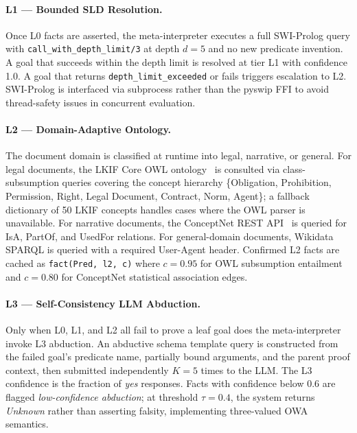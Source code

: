 \documentclass[11pt,letterpaper]{article}
\begin{document}
\paragraph{L1 --- Bounded SLD Resolution.}
Once L0 facts are asserted, the meta-interpreter executes a full SWI-Prolog query with \texttt{call\_with\_depth\_limit/3} at depth
$d = 5$ and no new predicate invention. A goal that succeeds within the depth limit is resolved at tier L1 with confidence
1.0. A goal that returns \texttt{depth\_limit\_exceeded} or fails triggers escalation to L2. SWI-Prolog is interfaced via subprocess
rather than the pyswip FFI to avoid thread-safety issues in concurrent evaluation.

\paragraph{L2 --- Domain-Adaptive Ontology.}
The document domain is classified at runtime into legal, narrative, or general. For legal documents, the LKIF Core OWL
ontology~\citep{Hoekstra2007} is consulted via class-subsumption queries covering the concept hierarchy \{Obligation, Prohibition, Permission,
Right, Legal Document, Contract, Norm, Agent\}; a fallback dictionary of 50 LKIF concepts handles cases where the OWL
parser is unavailable. For narrative documents, the ConceptNet REST API~\citep{Speer2017} is queried for IsA, PartOf, and UsedFor relations.
For general-domain documents, Wikidata SPARQL is queried with a required User-Agent header. Confirmed L2 facts are cached
as \texttt{fact(Pred, l2, c)} where $c = 0.95$ for OWL subsumption entailment and $c = 0.80$ for ConceptNet statistical association
edges.

\paragraph{L3 --- Self-Consistency LLM Abduction.}
Only when L0, L1, and L2 all fail to prove a leaf goal does the meta-interpreter
invoke L3 abduction. An abductive schema template query is constructed from the failed goal's predicate name, partially
bound arguments, and the parent proof context, then submitted independently $K = 5$ times to the LLM. The L3 confidence
is the fraction of \emph{yes} responses. Facts with confidence below 0.6 are flagged \emph{low-confidence abduction}; at threshold
$\tau = 0.4$, the system returns \emph{Unknown} rather than asserting falsity, implementing three-valued OWA semantics.
\end{document}
